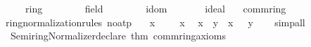 \begin{isabellebody}
\ \ \ \ \ ring\ {\isacharequal}{\kern0pt}\ {\isacharparenleft}{\kern0pt}{\isacharbrackleft}{\kern0pt}{\isacharbrackright}{\kern0pt}{\isacharcomma}{\kern0pt}\ {\isacharbrackleft}{\kern0pt}{\isacharbrackright}{\kern0pt}{\isacharparenright}{\kern0pt}{\isacharcomma}{\kern0pt}\isanewline
\ \ \ \ \ field\ {\isacharequal}{\kern0pt}\ {\isacharparenleft}{\kern0pt}{\isacharbrackleft}{\kern0pt}{\isacharbrackright}{\kern0pt}{\isacharcomma}{\kern0pt}\ {\isacharbrackleft}{\kern0pt}{\isacharbrackright}{\kern0pt}{\isacharparenright}{\kern0pt}{\isacharcomma}{\kern0pt}\isanewline
\ \ \ \ \ idom\ {\isacharequal}{\kern0pt}\ {\isacharbrackleft}{\kern0pt}{\isacharbrackright}{\kern0pt}{\isacharcomma}{\kern0pt}\isanewline
\ \ \ \ \ ideal\ {\isacharequal}{\kern0pt}\ {\isacharbrackleft}{\kern0pt}{\isacharbrackright}{\kern0pt}{\isacharbraceright}{\kern0pt}\isanewline
{\isacartoucheclose}%
\endisatagML
{\isafoldML}%
%
\isadelimML
\isanewline
%
\endisadelimML
\isanewline
{}\isamarkupfalse%
\isanewline
\isanewline
{}\isamarkupfalse%
\ comm{\isacharunderscore}{\kern0pt}ring{\isacharunderscore}{\kern0pt}{}\isanewline
{}\isanewline
\isanewline
{}\isamarkupfalse%
\ ring{\isacharunderscore}{\kern0pt}normalization{\isacharunderscore}{\kern0pt}rules\ {\isacharbrackleft}{\kern0pt}no{\isacharunderscore}{\kern0pt}atp{\isacharbrackright}{\kern0pt}{\isacharcolon}{\kern0pt}\isanewline
\ \ {\isachardoublequoteopen}{\isacharminus}{\kern0pt}\ x\ {\isacharequal}{\kern0pt}\ {\isacharparenleft}{\kern0pt}{\isacharminus}{\kern0pt}\ {}{\isacharparenright}{\kern0pt}\ {\isacharasterisk}{\kern0pt}\ x{\isachardoublequoteclose}\isanewline
\ \ {\isachardoublequoteopen}x\ {\isacharminus}{\kern0pt}\ y\ {\isacharequal}{\kern0pt}\ x\ {\isacharplus}{\kern0pt}\ {\isacharparenleft}{\kern0pt}{\isacharminus}{\kern0pt}\ y{\isacharparenright}{\kern0pt}{\isachardoublequoteclose}\isanewline
%
\isadelimproof
\ \ %
\endisadelimproof
%
\isatagproof
{}\isamarkupfalse%
\ simp{\isacharunderscore}{\kern0pt}all%
\endisatagproof
{\isafoldproof}%
%
\isadelimproof
\isanewline
%
\endisadelimproof
%
\isadelimML
\isanewline
%
\endisadelimML
%
\isatagML
{}\isamarkupfalse%
\ {\isacartoucheopen}\isanewline
\ \ Semiring{\isacharunderscore}{\kern0pt}Normalizer{\isachardot}{\kern0pt}declare\ {\isacharat}{\kern0pt}{\isacharbraceleft}{\kern0pt}thm\ comm{\isacharunderscore}{\kern0pt}ring{\isacharunderscore}{\kern0pt}{}{\isacharunderscore}{\kern0pt}axioms{\isacharbraceright}{\kern0pt}\isanewline

\end{isabellebody}
